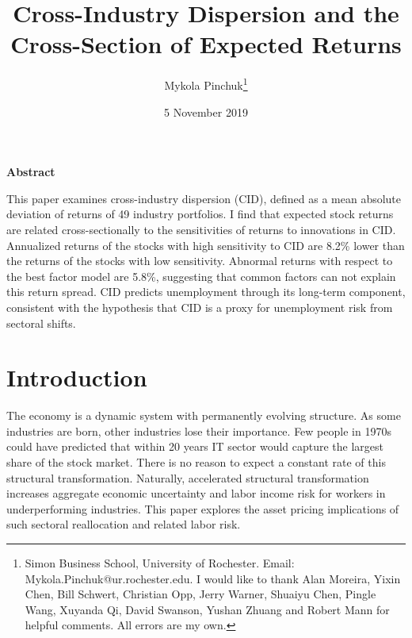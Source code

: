 \documentclass[12pt]{article}
\begin{document}
\onehalfspacing      %
\renewcommand{\footnote}{\endnote}  %

\author{\large{Mykola Pinchuk}\thanks{\rm Simon Business School, University of Rochester. Email: Mykola.Pinchuk@ur.rochester.edu. \newline I would like to thank Alan Moreira, Yixin Chen, Bill Schwert, Christian Opp, Jerry Warner, Shuaiyu Chen, Pingle Wang, Xuyanda Qi, David Swanson, Yushan Zhuang and Robert Mann for helpful comments. All errors are my own.}}

\title{\bf Cross-Industry Dispersion and the Cross-Section of Expected Returns}

\date{5 November 2019}  

\maketitle
\thispagestyle{empty}

\bigskip

\normalsize
\vspace{1cm}

\centerline{\bf Abstract}

\vspace{0.5cm}

\begin{onehalfspace}  %
  \noindent This paper examines cross-industry dispersion (CID), defined as a mean absolute deviation of returns of 49 industry portfolios. I find that expected stock returns are related cross-sectionally to the sensitivities of returns to innovations in CID. Annualized returns of the stocks with high sensitivity to CID are 8.2\% lower than the returns of the stocks with low sensitivity. Abnormal returns with respect to the best factor model are 5.8\%, suggesting that common factors can not explain this return spread. CID predicts unemployment through its long-term component, consistent with the hypothesis that CID is a proxy for unemployment risk from sectoral shifts. 
\end{onehalfspace}
\medskip


\clearpage
{}


\section{Introduction} \label{sec:Model}
The economy is a dynamic system with permanently evolving structure. As some industries are born, other industries lose their importance. Few people in 1970s could have predicted that within 20 years IT sector would capture the largest share of the stock market. There is no reason to expect a constant rate of this structural transformation. Naturally, accelerated structural transformation increases aggregate economic uncertainty and labor income risk for workers in underperforming industries. This paper explores the asset pricing implications of such sectoral reallocation and related labor risk.
\end{document}
